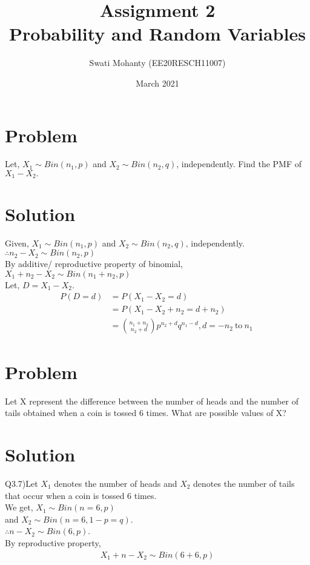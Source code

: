 \documentclass[journal,12pt,twocolumn]{IEEEtran}
\title{Assignment 2
\\Probability and Random Variables }
\author{Swati Mohanty (EE20RESCH11007) }
\date{March 2021}
\begin{document}
\maketitle

\section{Problem}
Let, $X_1 \sim Bin(n_1, p)$ and $X_2 \sim Bin(n_2, q)$, independently. Find the PMF of $X_1 - X_2.$
\section{Solution}
Given, $X_1 \sim Bin(n_1, p)$ and $X_2 \sim Bin(n_2, q)$, independently.\\
$\therefore n_2-X_2 \sim Bin(n_2, p)$\\
By additive/ reproductive property of binomial,\\
$X_1+n_2-X_2 \sim Bin(n_1+n_2, p)$\\
Let, $D= X_1 -X_2$.
\begin{align}
    P(D=d) &= P(X_1 -X_2 = d)\\
    &= P(X_1 -X_2 +n_2 = d +n_2)\\
    &= \binom{n_1+n_2}{n_2+d} p^{n_2+d} q^{n_1-d}, d= -n_2\ \text{to}\ n_1\ \label{subtraction}
\end{align}

\section{Problem}
Let X represent the difference between the
number of heads and the number of tails
obtained when a coin is tossed 6 times. What
are possible values of X?
\section{Solution}
Q3.7)Let $X_1$ denotes the number of heads and $X_2$ denotes the number of tails that occur when a coin is tossed 6 times.\\
We get, $X_1 \sim Bin(n=6, p)$\\
and $X_2 \sim Bin(n=6,1-p=q)$.\\
$\therefore n-X_2 \sim Bin(6, p)$.\\
By reproductive property,
\begin{align}
    X_1+n-X_2 \sim Bin(6+6, p)
\end{align}
\end{document}
